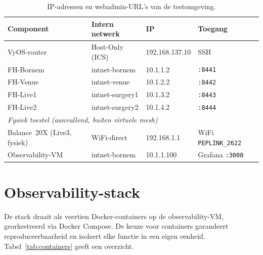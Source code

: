 \begin{table}[H]
  \centering
  \caption[IP-schema en toegang testomgeving]{IP-adressen en webadmin-URL's van de testomgeving.}
  \label{tab:ip-schema}
  \begin{tabular}{l l l l}
    \hline
    \textbf{Component} & \textbf{Intern netwerk} & \textbf{IP} & \textbf{Toegang} \\
    \hline
    VyOS-router         & Host-Only (ICS)  & 192.168.137.10 & SSH \\
    FH-Bornem           & intnet-bornem    & 10.1.1.2       & \texttt{:8441} \\
    FH-Venue            & intnet-venue     & 10.1.2.2       & \texttt{:8442} \\
    FH-Live1            & intnet-surgery1  & 10.1.3.2       & \texttt{:8443} \\
    FH-Live2            & intnet-surgery2  & 10.1.4.2       & \texttt{:8444} \\
    \multicolumn{4}{l}{\small\textit{Fysiek toestel (aanvullend, buiten virtuele mesh)}} \\
    Balance~20X (Live3, fysiek) & WiFi-direct & 192.168.1.1 & WiFi \texttt{PEPLINK\_2622} \\
    Observability-VM    & intnet-bornem    & 10.1.1.100     & Grafana \texttt{:3000} \\
    \hline
  \end{tabular}
\end{table}

\section{Observability-stack}
\label{sec:poc-stack}

De stack draait als veertien Docker-containers op de observability-VM, georkestreerd via Docker Compose. De keuze voor containers garandeert reproduceerbaarheid en isoleert elke functie in een eigen eenheid. Tabel~\ref{tab:containers} geeft een overzicht.

